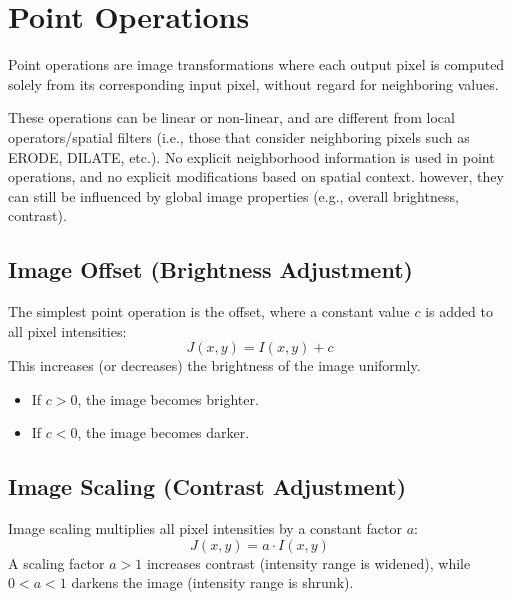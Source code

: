 \section{Point Operations}
\label{lec_02_sec_01}

Point operations are image transformations where each output pixel is computed solely from its corresponding input pixel, without regard for neighboring values.


These operations can be linear or non-linear, and are different from local operators/spatial filters (i.e., those that consider neighboring pixels such as ERODE, DILATE, etc.). No explicit neighborhood information is used in point operations, and no explicit modifications based on spatial context. however, they can still be influenced by global image properties (e.g., overall brightness, contrast).

\subsection{Image Offset (Brightness Adjustment)}
The simplest point operation is the offset, where a constant value $c$ is added to all pixel intensities:
$$
J(x, y) = I(x, y) + c
$$
This increases (or decreases) the brightness of the image uniformly.
\begin{itemize}
    \item If $c > 0$, the image becomes brighter.
    \item If $c < 0$, the image becomes darker.
\end{itemize}


\subsection{Image Scaling (Contrast Adjustment)}
Image scaling multiplies all pixel intensities by a constant factor $a$:
$$
J(x, y) = a \cdot I(x, y)
$$
A scaling factor $a > 1$ increases contrast (intensity range is widened), while $0 < a < 1$ darkens the image (intensity range is shrunk).


